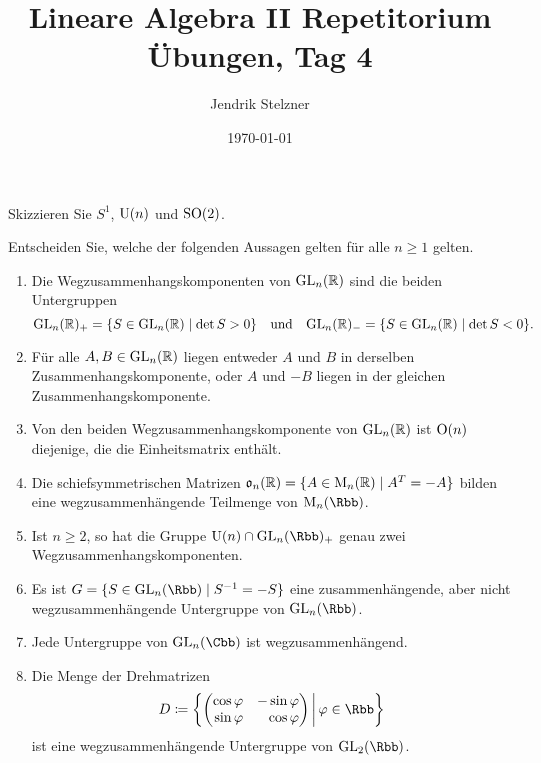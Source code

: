 \documentclass[a4paper, 10pt]{scrartcl}
\title{Lineare Algebra II Repetitorium \\ Übungen, Tag 4}
\author{Jendrik Stelzner}
\date{\today}
\begin{document}
\maketitle


\begin{question}
  Skizzieren Sie $S^1$, $\mathrm{U}(n)$ und $\mathrm{SO}(2)$.
\end{question}



\begin{question}
  Entscheiden Sie, welche der folgenden Aussagen gelten für alle $n \geq 1$ gelten.
  \begin{enumerate}[leftmargin=*]
    \item
      Die Wegzusammenhangskomponenten von $\mathrm{GL}_n(\mathbb{R})$ sind die beiden Untergruppen
      \[
        \mathrm{GL}_n(\mathbb{R})_+ = \{ S \in \mathrm{GL}_n(\mathbb{R}) \mid \det S > 0 \}
        \quad\text{und}\quad
        \mathrm{GL}_n(\mathbb{R})_- = \{ S \in \mathrm{GL}_n(\mathbb{R}) \mid \det S < 0 \}.
      \]
    \item
      Für alle $A, B \in \mathrm{GL}_n(\mathbb{R})$ liegen entweder $A$ und $B$ in derselben Zusammenhangskomponente, oder $A$ und $-B$ liegen in der gleichen Zusammenhangskomponente.
    \item
      Von den beiden Wegzusammenhangskomponente von $\mathrm{GL}_n(\mathbb{R})$ ist $\mathrm{O}(n)$ diejenige, die die Einheitsmatrix enthält.
    \item
      Die schiefsymmetrischen Matrizen $\mathfrak{o}_n(\mathbb{R}) = \{ A \in \mathrm{M}_n(\mathbb{R}) \mid A^T = -A \}$ bilden eine wegzusammenhängende Teilmenge von $\Mat_n(\Rbb)$.
    \item
      Ist $n \geq 2$, so hat die Gruppe $\Unitary(n) \cap \GL_n(\Rbb)_+$ genau zwei Wegzusammenhangskomponenten.
    \item
      Es ist $G = \{ S \in \GL_n(\Rbb) \mid S^{-1} = -S \}$ eine zusammenhängende, aber nicht wegzusammenhängende Untergruppe von $\GL_n(\Rbb)$.
    \item
      Jede Untergruppe von $\GL_n(\Cbb)$ ist wegzusammenhängend.
    \item
      Die Menge der Drehmatrizen
      \[
        D
        \coloneqq
        \left\{
          \begin{pmatrix*}[r]
            \cos \varphi  & -\sin \varphi \\
            \sin \varphi  &  \cos \varphi 
          \end{pmatrix*}
        \,\middle|\,
        \varphi \in \Rbb
        \right\}
      \]
      ist eine wegzusammenhängende Untergruppe von $\GL_2(\Rbb)$.
  \end{enumerate}
\end{question}
\end{document}
